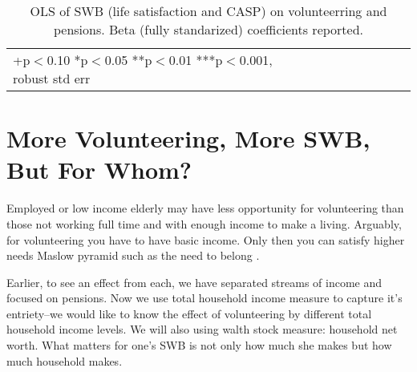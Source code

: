 \documentclass[10pt, letterpaper]{article}
\begin{document}
\begin{spacing}{1.4}


\begin{spacing}{.9}
\begin{table}[H]\centering \caption{OLS of SWB  (life satisfaction and CASP) on
    volunteerring and pensions. Beta (fully standarized) coefficients reported.}  \begin{scriptsize} \begin{tabular}{p{1.8in}p{.5in}p{.5in}p{.5in}p{.5in}|p{.5in}p{.5in}p{.5in}p{.5in}p{.5in}p{.4in}p{.5in}p{.4in}}\hline 
      \hline\multicolumn{5}{l}{+p$<$0.10 *p$<$0.05 **p$<$0.01 ***p$<$0.001,
        robust std err} \end{tabular}\label{regCw6w4} \end{scriptsize}\end{table}
\end{spacing}




\section{More Volunteering, More SWB, But For Whom?}

 Employed or low income elderly may have less opportunity for
 volunteering than those not working full time and with enough income to make a
 living. %
%
Arguably, for volunteering you have to have basic income. Only then you can
satisfy  higher needs  Maslow pyramid  such as the need to belong \citep{maslow87}.

Earlier,  to see an effect from each, we have separated streams of income and focused on pensions. 
Now we use total household income measure to capture it's entriety--we would
like to know the effect of volunteering by different total household income
levels. We will  also using walth stock measure: household net worth.
%
What matters for one's SWB is not only how much she makes but how much household makes.


\end{spacing}
\end{document}
